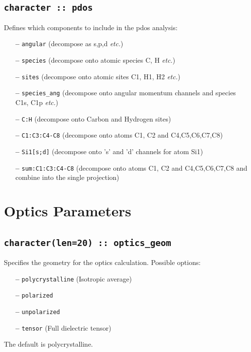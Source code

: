\documentclass[a4paper,11pt,twoside]{book}
\begin{document}
{\subsection[pdos]{\tt character :: pdos}
Defines which components to include in the pdos analysis:

\begin{itemize}
\item[{\bf --}]  \verb#angular# (decompose as s,p,d \emph{etc.})
\item[{\bf --}]  \verb#species#    (decompose onto atomic species C, H \emph{etc.})
\item[{\bf --}]  \verb#sites#    (decompose onto atomic sites C1, H1, H2 \emph{etc.})
\item[{\bf --}]  \verb#species_ang#    (decompose onto angular momentum channels and species C1s, C1p \emph{etc.})
\item[{\bf --}]  \verb#C:H#     (decompose onto Carbon and Hydrogen sites)
\item[{\bf --}]  \verb#C1:C3:C4-C8#  (decompose onto atoms C1, C2 and C4,C5,C6,C7,C8)
\item[{\bf --}]  \verb#Si1[s;d]#     (decompose onto 's' and 'd' channels for
  atom Si1)
\item[{\bf --}]  \verb#sum:C1:C3:C4-C8#  (decompose onto atoms C1, C2 and C4,C5,C6,C7,C8 and combine into the single projection)

\end{itemize}

\section{Optics Parameters}

\subsection[optics\_geom]{\tt character(len=20) :: optics\_geom}

Specifies the geometry for the optics calculation.  Possible options:
\begin{itemize}
\item[{\bf --}]  \verb#polycrystalline# (Isotropic average)
\item[{\bf --}]  \verb#polarized#  
\item[{\bf --}]  \verb#unpolarized# 
\item[{\bf --}]  \verb#tensor# (Full dielectric tensor)
\end{itemize}
The default is polycrystalline.

}
\end{document}

